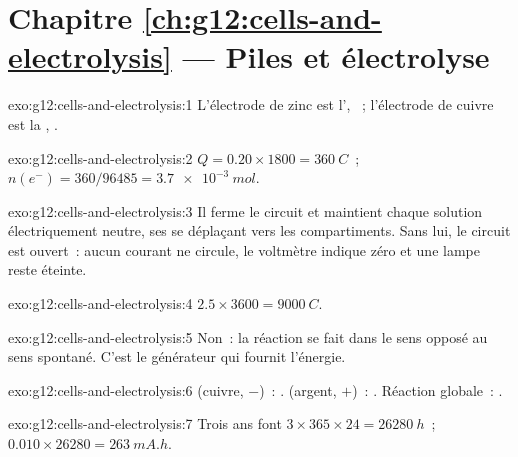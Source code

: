 \section*{Chapitre \ref{ch:g12:cells-and-electrolysis} --- Piles et électrolyse}

\begin{solution}{exo:g12:cells-and-electrolysis:1}
L'électrode de zinc est l', ~; l'électrode
de cuivre est la , .
\end{solution}

\begin{solution}{exo:g12:cells-and-electrolysis:2}
$Q = 0.20 \times 1800 = \qty{360}{C}$~; $n(e^-) = 360/96485 =
\qty{3.7e-3}{mol}$.
\end{solution}

\begin{solution}{exo:g12:cells-and-electrolysis:3}
Il ferme le circuit et maintient chaque solution électriquement
neutre, ses  se déplaçant vers les compartiments. Sans lui, le
circuit est ouvert~: aucun courant ne circule, le voltmètre indique zéro
et une lampe reste éteinte.
\end{solution}

\begin{solution}{exo:g12:cells-and-electrolysis:4}
$2.5 \times 3600 = \qty{9000}{C}$.
\end{solution}

\begin{solution}{exo:g12:cells-and-electrolysis:5}
Non~: la réaction se fait dans le sens opposé au sens spontané. C'est le
générateur qui fournit l'énergie.
\end{solution}

\begin{solution}{exo:g12:cells-and-electrolysis:6}
 (cuivre, $-$)~: .  (argent, $+$)~:
. Réaction globale~: .
\end{solution}

\begin{solution}{exo:g12:cells-and-electrolysis:7}
Trois ans font $3 \times 365 \times 24 = \qty{26280}{h}$~;
$0.010 \times 26280 = \qty{263}{mA.h}$.
\end{solution}


